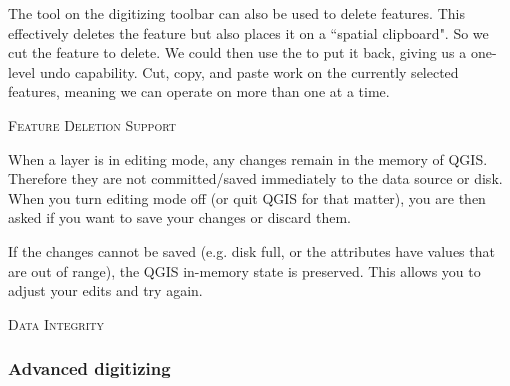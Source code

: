 The  tool on the digitizing toolbar can
also be used to delete features. This effectively deletes the feature but
also places it on a ``spatial clipboard". So we cut the feature to delete. 
We could then use the  to put it back, giving us a one-level undo 
capability. Cut, copy, and paste work on the currently selected features, 
meaning we can operate on more than one at a time.

\begin{Tip}[ht]\caption{\textsc{Feature Deletion Support}}
\end{Tip}


When a layer is in editing mode, any changes remain in the memory of QGIS.
Therefore they are not committed/saved immediately to the data source or disk.
When you turn editing mode off (or quit QGIS for that matter), 
you are then asked if you want to save your
changes or discard them.

If the changes cannot be saved (e.g. disk full, or the attributes have
values that are out of range), the QGIS in-memory state is preserved.  This
allows you to adjust your edits and try again.

\begin{Tip}[ht]\caption{\textsc{Data Integrity}}
\end{Tip}

\subsubsection{Advanced digitizing}
\label{sec:advanced_edit}

